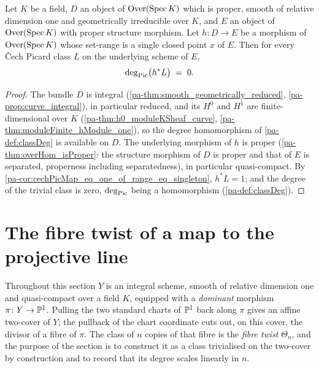 \begin{theorem}
  \label{pa-thm:classDeg_cechPicMap_eq_zero_of_range_eq_singleton}
  \leanok

  Let \(K\) be a field, \(D\) an object of \(\mathrm{Over}(\operatorname{Spec} K)\) which is proper, smooth
  of relative dimension one and geometrically irreducible over \(K\), and \(E\) an
  object of \(\mathrm{Over}(\operatorname{Spec} K)\) with proper structure morphism. Let \(h : D \to E\) be
  a morphism of \(\mathrm{Over}(\operatorname{Spec} K)\) whose set-range is a single closed point \(x\) of
  \(E\). Then for every \v Cech Picard class \(L\) on the underlying scheme of \(E\),
  \[
    \deg_{\operatorname{Pic}}\bigl(h^{*}L\bigr) \;=\; 0 .
  \]
\end{theorem}
\begin{proof}
  \leanok
  The bundle \(D\) is integral (\ref{pa-thm:smooth_geometrically_reduced},
  \ref{pa-prop:curve_integral}), in particular reduced, and its \(H^0\) and \(H^1\) are
  finite-dimensional over \(K\) (\ref{pa-thm:h0_moduleKSheaf_curve},
  \ref{pa-thm:moduleFinite_hModule_one}), so the degree homomorphism of
  \ref{pa-def:classDeg} is available on \(D\). The underlying morphism of \(h\) is proper
  (\ref{pa-thm:overHom_isProper}: the structure morphism of \(D\) is proper and that of
  \(E\) is separated, properness including separatedness), in particular
  quasi-compact. By \ref{pa-cor:cechPicMap_eq_one_of_range_eq_singleton},
  \(h^{*}L = 1\); and the degree of the trivial class is zero, \(\deg_{\operatorname{Pic}}\) being a
  homomorphism (\ref{pa-def:classDeg}).
\end{proof}

\section{The fibre twist of a map to the projective line}

Throughout this section \(Y\) is an integral scheme, smooth of relative dimension one and
quasi-compact over a field \(K\), equipped with a \emph{dominant} morphism \(\pi \colon Y \to
\mathbb{P}^1\). Pulling the two standard charts of \(\mathbb{P}^1\) back along \(\pi\) gives an affine two-cover
of \(Y\); the pullback of the chart coordinate cuts out, on this cover, the divisor of a fibre of
\(\pi\). The class of \(n\) copies of that fibre is the \emph{fibre twist} \(\Theta_n\), and the
purpose of the section is to construct it as a class trivialised on the two-cover by construction
and to record that its degree scales linearly in \(n\).

